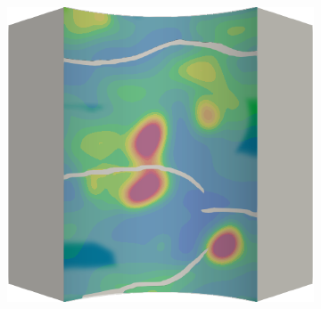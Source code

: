 \begin{frame}
\begin{columns}[T]
\begin{column}{0.6\textwidth}
\begin{figure}
{\begin{subfigure}{0.19\textwidth}
          \end{subfigure}
          \hspace{0.06\textwidth}
          \begin{subfigure}{0.19\textwidth}
            \centering
            \includegraphics[width=\textwidth]{Chapter345/figures/ep.0033}
          \end{subfigure}
        }
        

\end{figure}
\end{column}
\end{columns}
\end{frame}
